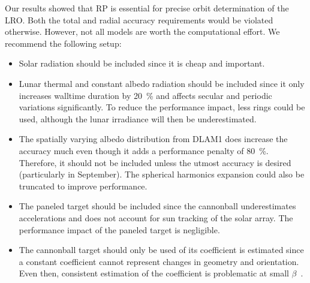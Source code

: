 Our results showed that \gls{RP} is essential for precise orbit determination of the \gls{LRO}. Both the total and radial accuracy requirements would be violated otherwise. However, not all models are worth the computational effort. We recommend the following setup:
\begin{itemize}
    \item Solar radiation should be included since it is cheap and important.
    \item Lunar thermal and constant albedo radiation should be included since it only increases walltime duration by \qty{20}{\percent} and affects secular and periodic variations significantly. To reduce the performance impact, less rings could be used, although the lunar irradiance will then be underestimated.
    \item The spatially varying albedo distribution from \gls{DLAM1} does increase the accuracy much even though it adds a performance penalty of \qty{80}{\percent}. Therefore, it should not be included unless the utmost accuracy is desired (particularly in September). The spherical harmonics expansion could also be truncated to improve performance.
    \item The paneled target should be included since the cannonball underestimates accelerations and does not account for sun tracking of the solar array. The performance impact of the paneled target is negligible.
    \item The cannonball target should only be used of its coefficient is estimated since a constant coefficient cannot represent changes in geometry and orientation. Even then, consistent estimation of the coefficient is problematic at small $\beta$~\cite{Slojkowski2014}.
\end{itemize}

